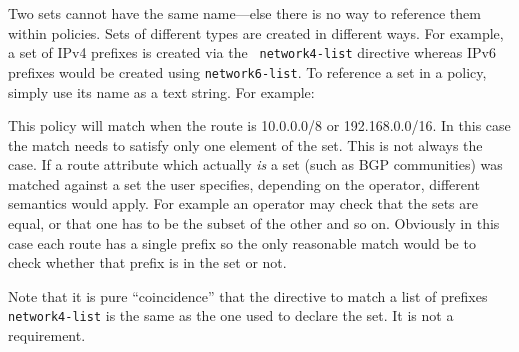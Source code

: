 Two sets cannot have the same name---else there is no way to reference
them within policies.  Sets of different types are created in different
ways.  For example, a set of IPv4 prefixes is created via the {\tt
network4-list} directive whereas IPv6 prefixes would be created using
{\tt network6-list}.  To reference a set in a policy, simply use its
name as a text string.  For example:

\noindent{}

This policy will match when the route is 10.0.0.0/8 or 192.168.0.0/16.  In this
case the match needs to satisfy only one element of the set.  This is not always
the case.  If a route attribute which actually {\em is} a set (such as BGP
communities) was matched against a set the user specifies, depending on the
operator, different semantics would apply.  For example an operator may check
that the sets are equal, or that one has to be the subset of the other and so
on.  Obviously in this case each route has a single prefix so the only
reasonable match would be to check whether that prefix is in the set or not.

Note that it is pure ``coincidence'' that the directive to match a list of
prefixes {\tt network4-list} is the same as the one used to declare the set.  It
is not a requirement.


